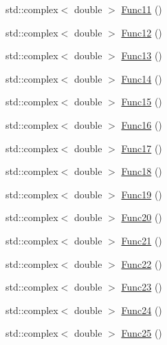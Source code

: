 \begin{DoxyCompactItemize}
\item 
std\-::complex$<$ double $>$ \hyperlink{classosea_1_1ofreq_1_1_eqn_translation_ace18b862c56308ef2c7f3243cb35b163}{Func11} ()
\item 
std\-::complex$<$ double $>$ \hyperlink{classosea_1_1ofreq_1_1_eqn_translation_a45e21f1422abebefdfa62d99a9967a63}{Func12} ()
\item 
std\-::complex$<$ double $>$ \hyperlink{classosea_1_1ofreq_1_1_eqn_translation_a3c5e3eb3826e4920d8b8c4568e00705a}{Func13} ()
\item 
std\-::complex$<$ double $>$ \hyperlink{classosea_1_1ofreq_1_1_eqn_translation_a8bd3f1a3758e840b1acc6574fc14f8ed}{Func14} ()
\item 
std\-::complex$<$ double $>$ \hyperlink{classosea_1_1ofreq_1_1_eqn_translation_aeddc8ce8ccb1988c3ad8b9216e18016e}{Func15} ()
\item 
std\-::complex$<$ double $>$ \hyperlink{classosea_1_1ofreq_1_1_eqn_translation_a8a118c276691f4511744ecda468132c8}{Func16} ()
\item 
std\-::complex$<$ double $>$ \hyperlink{classosea_1_1ofreq_1_1_eqn_translation_aa949901c744cfbec9d7d164123554374}{Func17} ()
\item 
std\-::complex$<$ double $>$ \hyperlink{classosea_1_1ofreq_1_1_eqn_translation_a7a1a7c79deb8f73a08b8b4dc243dd6ce}{Func18} ()
\item 
std\-::complex$<$ double $>$ \hyperlink{classosea_1_1ofreq_1_1_eqn_translation_adaf792010aee1424bee32fcba30a4114}{Func19} ()
\item 
std\-::complex$<$ double $>$ \hyperlink{classosea_1_1ofreq_1_1_eqn_translation_adebc5be96e968b8b4828e934bba67620}{Func20} ()
\item 
std\-::complex$<$ double $>$ \hyperlink{classosea_1_1ofreq_1_1_eqn_translation_a92400de004748784067aa0ab67d09bca}{Func21} ()
\item 
std\-::complex$<$ double $>$ \hyperlink{classosea_1_1ofreq_1_1_eqn_translation_ac79bd87a679d5e366ee7baf80a9b98b6}{Func22} ()
\item 
std\-::complex$<$ double $>$ \hyperlink{classosea_1_1ofreq_1_1_eqn_translation_a5be4c031857623713004dfa644b93a0d}{Func23} ()
\item 
std\-::complex$<$ double $>$ \hyperlink{classosea_1_1ofreq_1_1_eqn_translation_aa093ee40bb9b381f15c8b7ee1c005915}{Func24} ()
\item 
std\-::complex$<$ double $>$ \hyperlink{classosea_1_1ofreq_1_1_eqn_translation_a6bb996ef238c2b8183b7a3cdc7c15540}{Func25} ()
\item 

\end{DoxyCompactItemize}
